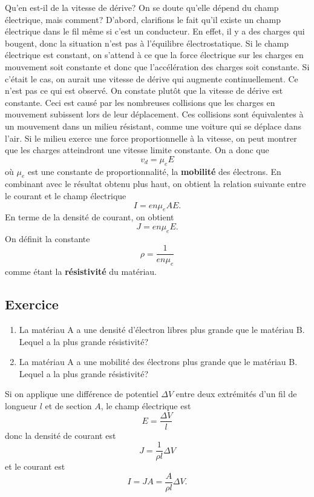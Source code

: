 Qu'en est-il de la vitesse de dérive? On se doute qu'elle dépend du champ
électrique, mais comment? D'abord, clarifions le fait qu'il existe un champ
électrique dans le fil même si c'est un conducteur. En effet, il y a des
charges qui bougent, donc la situation n'est pas à l'équilibre électrostatique.
Si le champ électrique est constant, on s'attend à ce que la force électrique
sur les charges en mouvement soit constante et donc que l'accélération des
charges soit constante. Si c'était le cas, on aurait une vitesse de dérive qui
augmente continuellement. Ce n'est pas ce qui est observé. On constate plutôt
que la vitesse de dérive est constante. Ceci est causé par les nombreuses
collisions que les charges en mouvement subissent lors de leur déplacement. Ces
collisions sont équivalentes à un mouvement dans un milieu résistant, comme une
voiture qui se déplace dans l'air. Si le milieu exerce une force
proportionnelle à la vitesse, on peut montrer que les charges atteindront une
vitesse limite constante. On a donc que
\[
  v_d = \mu_e E
\]
où $\mu_e$ est une constante de proportionnalité, la \textbf{mobilité} des
électrons. En combinant avec le résultat obtenu plus haut, on obtient la
relation suivante entre le courant et le champ électrique
\[
  I = en\mu_e AE.
\]
En terme de la densité de courant, on obtient
\[
  J = en\mu_e E.
\]
On définit la constante
\[
  \rho = \frac{1}{en\mu_e}
\]
comme étant la \textbf{résistivité} du matériau.


\subsection*{Exercice}

\begin{enumerate}
  \item La matériau A a une densité d'électron libres plus grande que le
    matériau B.  Lequel a la plus grande résistivité?
  \item La matériau A a une mobilité des électrons plus grande que le
    matériau B.  Lequel a la plus grande résistivité?
\end{enumerate}


\sectionline


Si on applique une différence de potentiel $\Delta V$ entre deux extrémités
d'un fil de longueur $l$ et de section $A$, le champ électrique est
$$E = \frac{\Delta V}{l}$$
donc la densité de courant est
$$J = \frac{1}{\rho l} \Delta V$$
et le courant est
$$I = JA = \frac{A}{\rho l} \Delta V.$$

